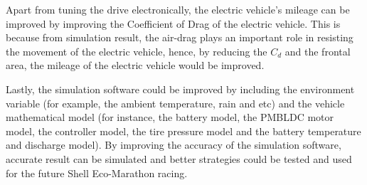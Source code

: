 Apart from tuning the drive electronically, the electric vehicle's mileage can be improved by improving the Coefficient of Drag of the electric vehicle. This is because from simulation result, the air-drag plays an important role in resisting the movement of the electric vehicle, hence, by reducing the $C_{d}$ and the frontal area, the mileage of the electric vehicle would be improved.

Lastly, the simulation software could be improved by including the environment variable (for example, the ambient temperature, rain and etc) and the vehicle mathematical model (for instance, the battery model, the PMBLDC motor model, the controller model, the tire pressure model and the battery temperature and discharge model). By improving the accuracy of the simulation software, accurate result can be simulated and better strategies could be tested and used for the future Shell Eco-Marathon racing.
